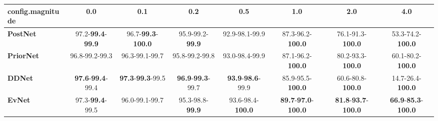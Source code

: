 \begin{tabular}{lccccccc}
\toprule
\textbf{config.magnitude} &                               0.0 &                                0.1 &                               0.2 &                               0.5 &                                         1.0 &                                         2.0 &                                         4.0 \\
\midrule
\textbf{PostNet } &  97.2-\textbf{99.4}-\textbf{99.9} &  96.7-\textbf{99.3}-\textbf{100.0} &           95.9-99.2-\textbf{99.9} &                    92.9-98.1-99.9 &                    87.3-96.2-\textbf{100.0} &                    76.1-91.3-\textbf{100.0} &                    53.3-74.2-\textbf{100.0} \\
\textbf{PriorNet} &                    96.8-99.2-99.3 &                     96.3-99.1-99.7 &                    95.8-99.2-99.8 &                    93.0-98.4-99.9 &                    87.1-96.2-\textbf{100.0} &                    80.2-93.3-\textbf{100.0} &                    60.1-80.2-\textbf{100.0} \\
\textbf{DDNet   } &  \textbf{97.6}-\textbf{99.4}-99.4 &   \textbf{97.3}-\textbf{99.3}-99.5 &  \textbf{96.9}-\textbf{99.3}-99.7 &  \textbf{93.9}-\textbf{98.6}-99.9 &                    85.9-95.5-\textbf{100.0} &                    60.6-80.8-\textbf{100.0} &                    14.7-26.4-\textbf{100.0} \\
\textbf{EvNet   } &           97.3-\textbf{99.4}-99.5 &                     96.0-99.1-99.7 &           95.3-98.8-\textbf{99.9} &          93.6-98.4-\textbf{100.0} &  \textbf{89.7}-\textbf{97.0}-\textbf{100.0} &  \textbf{81.8}-\textbf{93.7}-\textbf{100.0} &  \textbf{66.9}-\textbf{85.3}-\textbf{100.0} \\
\bottomrule
\end{tabular}
